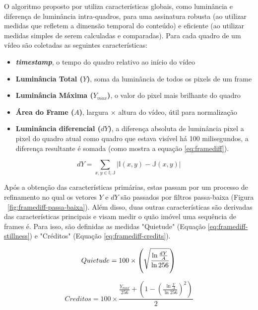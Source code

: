   O algoritmo proposto por \citeauthor{cook2011efficient} utiliza características globais, como luminância e diferença de luminância intra-quadros, para uma assinatura robusta (ao utilizar medidas que refletem a dimensão temporal do conteúdo) e eficiente (ao utilizar medidas simples de serem calculadas e comparadas). Para cada quadro de um vídeo são coletadas as seguintes características: 

  \begin{itemize}
    \item \textbf{\textit{timestamp}}, o tempo do quadro relativo ao início do vídeo
    \item \textbf{Luminância Total ($Y$)}, soma da luminância de todos os pixels de um frame
    \item \textbf{Luminância Máxima ($Y_{max}$)}, o valor do pixel mais brilhante do quadro
    \item \textbf{Área do Frame ($A$)}, largura $\times$ altura do vídeo, útil para normalização
    \item \textbf{Luminância diferencial ($dY$)}, a diferença absoluta de luminância pixel a pixel do quadro atual como quadro que estava visível há 100 milisegundos, a diferença resultante é somada (como mostra a equação \ref{eq:framediff}). 
  \end{itemize}

\begin{equation}
	\label{eq:framediff}
	dY = \sum_{x,y \in  \mathbb{I,J}} |\mathbb{I}(x,y) - \mathbb{J}(x,y)|
\end{equation} 

  Após a obtenção das características primárias, estas passam por um processo de refinamento no qual os vetores $Y$ e $dY$ são passados por filtros passa-baixa (Figura ~\ref{fig:framediff-passa-baixa}). Além disso, duas outras características são derivadas das características principais e visam medir o quão imóvel uma sequência de frames é. Para isso, são definidas as medidas "Quietude" (Equação \ref{eq:framediff-stillness}) e "Créditos" (Equação \ref{eq:framediff-credits}).

  \begin{equation}
    \label{eq:framediff-stillness}
    Quietude = 100 \times \left(\sqrt{\frac{\ln\frac{dY}{A}}{\ln256}}\right) \\
  \end{equation}

  \begin{equation}
    \label{eq:framediff-credits}
    Creditos = 100 \times \frac{\frac{Y_{max}}{256} + \left( 1 - \left( \frac{\ln\frac{Y}{A}}{\ln256} \right)^2\right)}{2}
  \end{equation}


